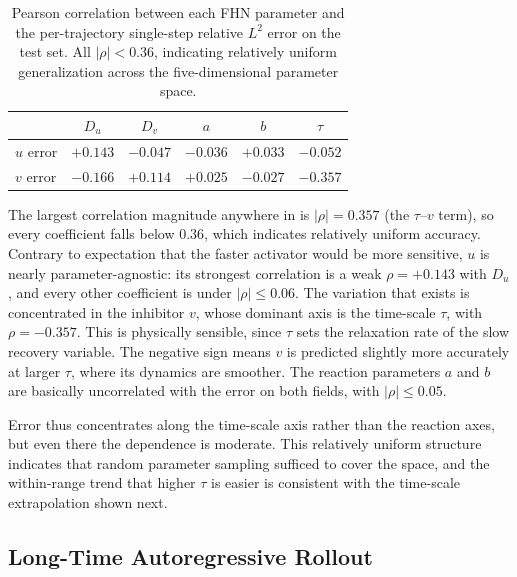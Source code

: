 \documentclass[runningheads]{llncs}
\begin{document}
\begin{table}[!ht]
\begin{center}
\begin{small}
\begin{sc}
\begin{tabular}{lccccc}
\toprule
 & $D_u$ & $D_v$ & $a$ & $b$ & $\tau$ \\
\midrule
$u$ error & $+0.143$ & $-0.047$ & $-0.036$ & $+0.033$ & $-0.052$ \\
$v$ error & $-0.166$ & $+0.114$ & $+0.025$ & $-0.027$ & $-0.357$ \\
\bottomrule
\end{tabular}
\end{sc}
\end{small}
\end{center}
\smallskip
\caption{Pearson correlation between each FHN parameter and the per-trajectory single-step relative $L^2$ error on the test set. All $|\rho| < 0.36$, indicating relatively uniform generalization across the five-dimensional parameter space.}
\label{tab:parameter_correlation}
\end{table}

The largest correlation magnitude anywhere in  is $|\rho| = 0.357$ (the $\tau$--$v$ term), so every coefficient falls below $0.36$, which indicates relatively uniform accuracy. Contrary to expectation that the faster activator would be more sensitive, $u$ is nearly parameter-agnostic: its strongest correlation is a weak $\rho = +0.143$ with $D_u$, and every other coefficient is under $|\rho| \le 0.06$. The variation that exists is concentrated in the inhibitor $v$, whose dominant axis is the time-scale $\tau$, with $\rho = -0.357$. This is physically sensible, since $\tau$ sets the relaxation rate of the slow recovery variable. The negative sign means $v$ is predicted slightly more accurately at larger $\tau$, where its dynamics are smoother. The reaction parameters $a$ and $b$ are basically uncorrelated with the error on both fields, with $|\rho| \le 0.05$.

Error thus concentrates along the time-scale axis rather than the reaction axes, but even there the dependence is moderate. This relatively uniform structure indicates that random parameter sampling sufficed to cover the space, and the within-range trend that higher $\tau$ is easier is consistent with the time-scale extrapolation shown next.

\subsection{Long-Time Autoregressive Rollout}
\label{sec:autoregressive_results}
\end{document}
